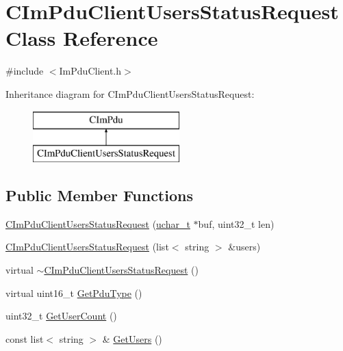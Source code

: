 \hypertarget{class_c_im_pdu_client_users_status_request}{}\section{C\+Im\+Pdu\+Client\+Users\+Status\+Request Class Reference}
\label{class_c_im_pdu_client_users_status_request}


{\ttfamily \#include $<$Im\+Pdu\+Client.\+h$>$}

Inheritance diagram for C\+Im\+Pdu\+Client\+Users\+Status\+Request\+:\begin{figure}[H]
\begin{center}
\leavevmode
\includegraphics[height=2.000000cm]{class_c_im_pdu_client_users_status_request}
\end{center}
\end{figure}
\subsection*{Public Member Functions}
\begin{DoxyCompactItemize}
\item 
\hyperlink{class_c_im_pdu_client_users_status_request_a3e68cab8e71ce2af01d0605efc19632d}{C\+Im\+Pdu\+Client\+Users\+Status\+Request} (\hyperlink{base_2ostype_8h_a124ea0f8f4a23a0a286b5582137f0b8d}{uchar\+\_\+t} $\ast$buf, uint32\+\_\+t len)
\item 
\hyperlink{class_c_im_pdu_client_users_status_request_a37d82e39b1749d04eb98e74f59e7351b}{C\+Im\+Pdu\+Client\+Users\+Status\+Request} (list$<$ string $>$ \&users)
\item 
virtual \hyperlink{class_c_im_pdu_client_users_status_request_a47bab1bd95a9930109d0acb0fd1a7eec}{$\sim$\+C\+Im\+Pdu\+Client\+Users\+Status\+Request} ()
\item 
virtual uint16\+\_\+t \hyperlink{class_c_im_pdu_client_users_status_request_a2902c70a2793666ecea63651ac742da3}{Get\+Pdu\+Type} ()
\item 
uint32\+\_\+t \hyperlink{class_c_im_pdu_client_users_status_request_a61eeda8f17d72d9571710f62cf558ee4}{Get\+User\+Count} ()
\item 
const list$<$ string $>$ \& \hyperlink{class_c_im_pdu_client_users_status_request_a4b8399d4a5487525e17e4ad7ca17d2bc}{Get\+Users} ()
\end{DoxyCompactItemize}
